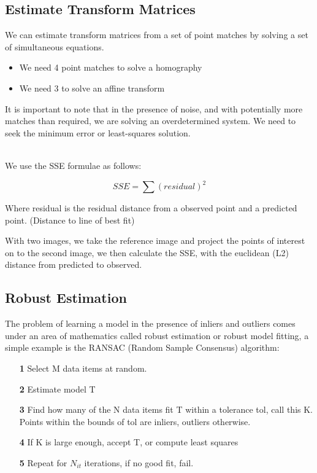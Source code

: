\subsection{Estimate Transform Matrices}

We can estimate transform matrices from a set of point matches by solving a set of simultaneous equations. 

\begin{itemize}
    \itemsep0em
    \item We need 4 point matches to solve a homography
    \item We need 3 to solve an affine transform
\end{itemize}

\noindent It is important to note that in the presence of noise, and with potentially more matches than required, we are solving an overdetermined system. We need to seek the minimum error or least-squares solution.

\\

\noindent We use the SSE formulae as follows:

\begin{equation}
    SSE = \sum (residual)^2
\end{equation}

\noindent Where residual is the residual distance from a observed point and a predicted point. (Distance to line of best fit)

\noindent With two images, we take the reference image and project the points of interest on to the second image, we then calculate the SSE, with the euclidean (L2) distance from predicted to observed.

\subsection{Robust Estimation}

The problem of learning a model in the presence of inliers and outliers comes under an area of mathematics called robust estimation or robust model fitting, a simple example is the RANSAC (Random Sample Consensus) algorithm:

\begin{itemize}
    \item [\textbf{1}] Select M data items at random.
    \item [\textbf{2}] Estimate model T
    \item [\textbf{3}] Find how many of the N data items fit T within a tolerance tol, call this K. Points within the bounds of tol are inliers, outliers otherwise.
    \item [\textbf{4}] If K is large enough, accept T, or compute least squares
    \item [\textbf{5}] Repeat for $N_{it}$ iterations, if no good fit, fail.
\end{itemize}

